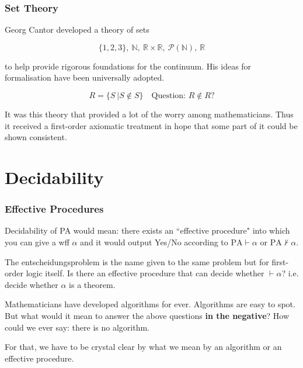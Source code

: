 \documentclass{beamer}
\begin{document}
\begin{frame}
	\frametitle{Set Theory}
	
	Georg Cantor developed a theory of sets 
	
	$$ \{1,2,3\}, \ \mathbb{N}, \ \mathbb{R}\times\mathbb{R}, \ \mathcal{P}(\mathbb{N}), \ \mathbb{R} $$
	
	to help provide rigorous foundations for the continuum. His ideas for formalisation have been universally adopted. 
	
	\vspace{0.4cm}
	
	$$R = \{S \ | S \notin S\} \quad \text{Question: } R \notin R?$$
	
	\vspace{0.5cm}
	
	It was this theory that provided a lot of the worry among mathematicians. Thus it received a first-order axiomatic treatment in hope that some part of it could be shown consistent.
	
	\vspace{3cm}
	
\end{frame}

\section{Decidability}

\begin{frame}
	\frametitle{Effective Procedures}
	
	Decidability of PA would mean: there exists an ``effective procedure" into which you can give a wff $\alpha$ and it would output Yes/No according to $\text{PA} \vdash \alpha$ or $\text{PA} \nvdash \alpha$.
	
	\vspace{0.5cm}
	
	The entscheidungsproblem is the name given to the same problem but for first-order logic itself. Is there an effective procedure that can decide whether $\vdash \alpha$? i.e. decide whether $\alpha$ is a theorem. 
	
	\vspace{0.5cm}
	
	Mathematicians have developed algorithms for ever. Algorithms are easy to spot. But what would it mean to answer the above questions {\bf in the negative}? How could we ever say: there is no algorithm.
	
	\vspace{0.5cm}
	
	For that, we have to be crystal clear by what we mean by an algorithm or an effective procedure. 
	
\end{frame}
\end{document}
